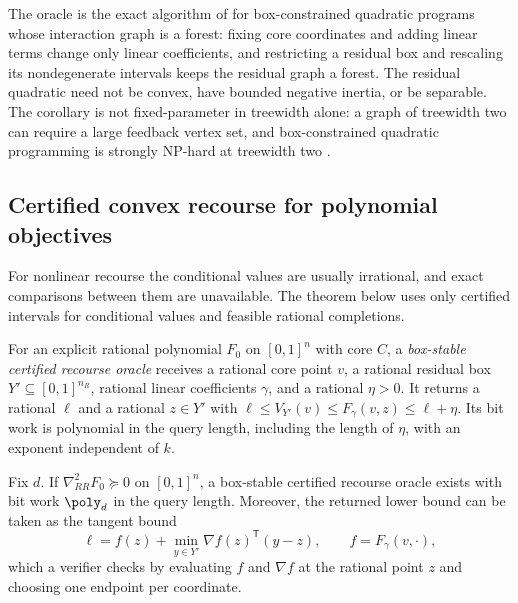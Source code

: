The oracle is the exact algorithm of \citet{DelPiaKhajavirad2026Forest} for
box-constrained quadratic programs whose interaction graph is a forest:
fixing core coordinates and adding linear terms change only linear
coefficients, and restricting a residual box and rescaling its nondegenerate
intervals keeps the residual graph a forest. The residual quadratic need not
be convex, have bounded negative inertia, or be separable. The corollary
is not fixed-parameter in treewidth alone: a graph of treewidth two can
require a large feedback vertex set, and box-constrained quadratic
programming is strongly NP-hard at treewidth two
\citep{DelPiaKhajavirad2026Forest}.

\subsection{Certified convex recourse for polynomial objectives}\label{sec:rec:poly}

For nonlinear recourse the conditional values are usually irrational, and
exact comparisons between them are unavailable. The theorem below uses only
certified intervals for conditional values and feasible rational
completions.

\begin{definition}\label{def:rec:cert-oracle}
For an explicit rational polynomial $F_0$ on $[0,1]^n$ with core $C$, a
\emph{box-stable certified recourse oracle} receives a rational core point
$v$, a rational residual box $Y'\subseteq[0,1]^{n_R}$, rational linear
coefficients $\gamma$, and a rational $\eta>0$. It returns a rational $\ell$
and a rational $z\in Y'$ with $\ell\le V_{Y'}(v)\le F_\gamma(v,z)\le\ell+\eta$.
Its bit work is polynomial in the query length, including the length of
$\eta$, with an exponent independent of $k$.
\end{definition}

\begin{lemma}\label{lem:rec:convex-oracle}
Fix $d$. If $\nabla^2_{RR}F_0\succeq0$ on $[0,1]^n$, a box-stable certified
recourse oracle exists with bit work $\poly_d$ in the query length. Moreover,
the returned lower bound can be taken as the tangent bound
\begin{equation}\label{eq:rec:tangent}
 \ell=f(z)+\min_{y\in Y'}\nabla f(z)^{\mathsf T}(y-z),\qquad
 f=F_\gamma(v,\cdot),
\end{equation}
which a verifier checks by evaluating $f$ and $\nabla f$ at the rational
point $z$ and choosing one endpoint per coordinate.
\end{lemma}

